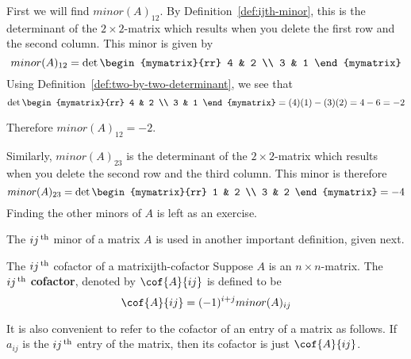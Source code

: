 \begin{solution}
  First we will find $minor(A) _{12}$. By
  Definition~\ref{def:ijth-minor}, this is the determinant of the
  $2\times 2$-matrix which results when you delete the first row and
  the second column. This minor is given by
  \begin{equation*}
    minor (A)_{12}
    =
    \det \begin{mymatrix}{rr}
      4 & 2 \\
      3 & 1
    \end{mymatrix}
  \end{equation*}
  Using Definition~\ref{def:two-by-two-determinant}, we see that
  \begin{equation*}
    \det \begin{mymatrix}{rr}
      4 & 2 \\
      3 & 1
    \end{mymatrix} = (4)(1) - (3)(2) = 4 - 6 = -2
  \end{equation*}

  Therefore $minor (A)_{12} = -2$. 

  Similarly, $minor(A)_{23}$ is the determinant of the
  $2\times 2$-matrix which results when you delete the second row and
  the third column. This minor is therefore
  \begin{equation*}
    minor (A)_{23} 
    =
    \det \begin{mymatrix}{rr}
      1 & 2 \\
      3 & 2
    \end{mymatrix} = -4
  \end{equation*}
  Finding the other minors of $A$ is left as an exercise.
\end{solution}

The $ij^{\,\rm th}$ minor of a matrix $A$ is used in another important
definition, given next.

\begin{definition}{The $ij^{\,\rm th}$ cofactor of a matrix}{ijth-cofactor}
  Suppose $A$ is an $n\times n$-matrix. The $ij^{\,\rm th}$
  \textbf{cofactor}, denoted by
  $\cof{A}{ij}$ is defined to be
  \begin{equation*}
    \cof{A}{ij} = (-1) ^{i+j} minor(A)_{ij} 
  \end{equation*}
\end{definition}

It is also convenient to refer to the cofactor of an entry of a matrix
as follows. If $a_{ij}$ is the $ij^{\,\rm th}$ entry of the matrix, then its
cofactor is just $\cof{A}{ij}$.

